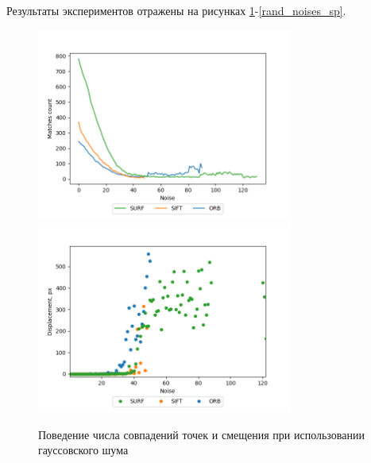 {{   			Результаты экспериментов отражены на рисунках \ref{rand_noises_gauss}-\ref{rand_noises_sp}. 
   			
   			\begin{figure}[H]
   				\centering                             
   				\includegraphics[width=0.75\textwidth,keepaspectratio]{ex2/gauss/Rand_noises_matches.png}   
   				\includegraphics[width=0.75\textwidth,keepaspectratio]{ex2/gauss/Rand_noises_displacement.png}       
   				\centering\caption{ Поведение числа совпадений точек и смещения при использовании гауссовского шума }
   				\label{rand_noises_gauss}                           
   			\end{figure}    
   		
}}
